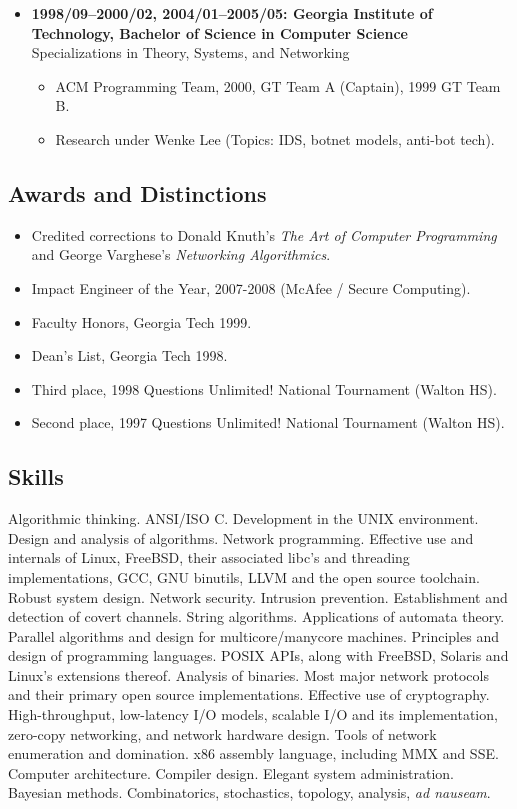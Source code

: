\documentclass{article}
\newenvironment{tightitemize}
{\begin{itemize}
  \setlength{\itemsep}{1pt}
  \setlength{\parskip}{0pt}
  \setlength{\parsep}{0pt}}
{\end{itemize}}
\begin{document}
\begin{tightitemize}
\item \textbf{1998/09--2000/02, 2004/01--2005/05: Georgia Institute of Technology,
Bachelor of Science in Computer Science}\\
Specializations in Theory, Systems, and Networking
\begin{tightitemize}
\item ACM Programming Team, 2000, GT Team A (Captain), 1999 GT Team B.
\item Research under Wenke Lee (Topics: IDS, botnet models, anti-bot tech).
\end{tightitemize}

\end{tightitemize}

\subsection*{Awards and Distinctions}
\begin{tightitemize}
\item Credited corrections to Donald Knuth's \textit{The Art of Computer Programming}
   and George Varghese's \textit{Networking Algorithmics}.
\item Impact Engineer of the Year, 2007-2008 (McAfee / Secure Computing).
\item Faculty Honors, Georgia Tech 1999.
\item Dean's List, Georgia Tech 1998.
\item Third place, 1998 Questions Unlimited! National Tournament (Walton HS).
\item Second place, 1997 Questions Unlimited! National Tournament (Walton HS).
\end{tightitemize}

\subsection*{Skills}
Algorithmic thinking. ANSI/ISO C. Development in the UNIX environment. Design
and analysis of algorithms. Network programming. Effective use and internals
of Linux, FreeBSD, their associated libc's and threading implementations,
GCC, GNU binutils, LLVM and the open source toolchain. Robust system design. 
Network security. Intrusion prevention. Establishment and detection of covert
channels. String algorithms. Applications of automata theory. Parallel
algorithms and design for multicore/manycore machines. Principles and design
of programming languages. POSIX APIs, along with FreeBSD, Solaris and Linux's
extensions thereof. Analysis of binaries. Most major network protocols and
their primary open source implementations. Effective use of cryptography. 
High-throughput, low-latency I/O models, scalable I/O and its implementation,
zero-copy networking, and network hardware design. Tools of network
enumeration and domination. x86 assembly language, including MMX and SSE. 
Computer architecture. Compiler design. Elegant system administration. 
Bayesian methods. Combinatorics, stochastics, topology, analysis, \textit{ad nauseam}. 
\end{document}
